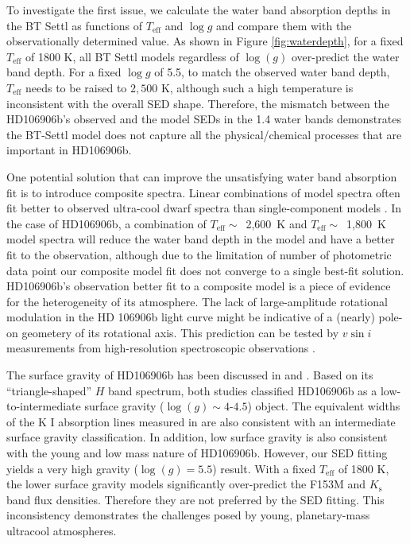 \documentclass[twocolumn]{aastex62}
\newcommand{\teff}{\ensuremath{T_{\mathrm{eff}}}\xspace}
\newcommand{\logg}{\ensuremath{\log(g)}\xspace}
\begin{document}
To investigate the first issue, we calculate the water band absorption depths in the BT Settl as functions of $T_{\mathrm{eff}}$ and $\log g$ and compare them with the {observationally determined} value. As shown in Figure \ref{fig:waterdepth}, for a fixed $T_{\mathrm{eff}}$ of 1800 K, all BT Settl models regardless of \logg{} over-predict the water band depth. For a fixed $\log g$ of 5.5, to match the observed water band depth, $T_{\mathrm{eff}}$ needs to be raised to $2,500$ K, although such a high temperature is {inconsistent} with the overall SED shape. Therefore, the mismatch between the HD106906b's observed and the model SEDs in the 1.4 \micron{} water bands demonstrates the BT-Settl model does not capture all the physical/chemical processes that are important in HD106906b.

One potential solution that can improve the unsatisfying water band absorption fit is to introduce composite spectra. Linear combinations of model spectra often fit better to observed ultra-cool dwarf spectra than single-component models \citep[e.g.,][]{Marley2010,Apai2013}. In the case of HD106906b, a combination of $\teff\sim$~2,600~K and $\teff\sim$~1,800~K model spectra will reduce the water band depth in the model and have a better fit to the observation, although due to the limitation of number of photometric data point our composite model fit does not converge to {a single} best-fit solution. HD106906b's observation better fit to a composite model is a piece of evidence for the heterogeneity of its atmosphere. {The lack of large-amplitude rotational modulation in the HD 106906b light curve might be indicative of a (nearly) pole-on geometery of its rotational axis.}
This prediction can be tested by $v\sin i$ measurements from high-resolution spectroscopic observations \citep[e.g.,][]{Snellen2014,Vos2017b,Bryan2018}.

 The surface gravity of HD106906b has been discussed in \citet{Bailey2013} and \citet{Daemgen2017}.  Based on its ``triangle-shaped'' $H$ band spectrum, both studies classified HD106906b as a low-to-intermediate surface gravity ($\logg\sim4\mbox{-}4.5$) object. The equivalent widths of the K I absorption lines measured in \citet{Daemgen2017} are also consistent with an intermediate surface gravity classification. In addition, low surface gravity is also consistent with the young and low mass nature of HD106906b. However, our SED fitting yields a very high gravity ($\logg=5.5$) result. With a fixed $T_{\mathrm{eff}}$ of 1800 K, the lower surface gravity models significantly over-predict the F153M and $K_{\mathrm{s}}$ band flux {densities}. Therefore they are not preferred by the SED fitting. This inconsistency demonstrates the challenges posed by young, planetary-mass ultracool atmospheres.
\end{document}

